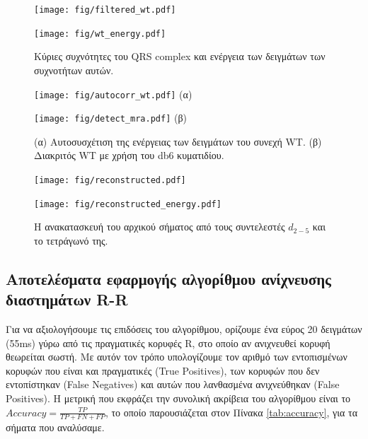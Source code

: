 \documentclass[11pt,a4paper]{article}
\begin{document}
\begin{figure}[H]
\centering
\begin{minipage}{0.48\textwidth}
	\centering
	\texttt{[image: fig/filtered\_wt.pdf]}
\end{minipage}
\begin{minipage}{0.48\textwidth}
	\centering
	\texttt{[image: fig/wt\_energy.pdf]}
\end{minipage}
\vfill
\caption{Κύριες συχνότητες του QRS complex και ενέργεια των δειγμάτων των συχνοτήτων αυτών.}
\label{fig:algorithm1}
\end{figure}
\begin{figure}[H]
\centering
\begin{minipage}{0.48\textwidth}
	\centering
	\texttt{[image: fig/autocorr\_wt.pdf]}	
	(α)
\end{minipage}
\begin{minipage}{0.48\textwidth}
	\centering
	\texttt{[image: fig/detect\_mra.pdf]}
	(β)
\end{minipage}
\vfill
\caption{(α) Αυτοσυσχέτιση της ενέργειας των δειγμάτων του συνεχή WT. (β) Διακριτός WT με χρήση του db6 κυματιδίου.}
\label{fig:algorithm2}
\end{figure}
\begin{figure}[H]
\centering
\begin{minipage}{0.48\textwidth}
	\centering
	\texttt{[image: fig/reconstructed.pdf]}
\end{minipage}
\begin{minipage}{0.48\textwidth}
	\centering
	\texttt{[image: fig/reconstructed\_energy.pdf]}
\end{minipage}
\vfill
\caption{Η ανακατασκευή του αρχικού σήματος από τους συντελεστές $d_{2-5}$ και το τετράγωνό της.}
\label{fig:algorithm3}
\end{figure}

\pagebreak

\subsection*{Αποτελέσματα εφαρμογής αλγορίθμου ανίχνευσης διαστημάτων R-R}

Για να αξιολογήσουμε τις επιδόσεις του αλγορίθμου, ορίζουμε ένα εύρος 20 δειγμάτων (55ms) γύρω από τις πραγματικές κορυφές R, στο οποίο αν ανιχνευθεί κορυφή θεωρείται σωστή. Με αυτόν τον τρόπο υπολογίζουμε τον αριθμό των εντοπισμένων κορυφών που είναι και πραγματικές (True Positives), των κορυφών που δεν εντοπίστηκαν (False Negatives) και αυτών που λανθασμένα ανιχνεύθηκαν (False Positives). Η μετρική που εκφράζει την συνολική ακρίβεια του αλγορίθμου είναι το $Accuracy = \frac{TP}{TP+FN+FP}$, το οποίο παρουσιάζεται στον Πίνακα \ref{tab:accuracy}, για τα σήματα που αναλύσαμε.
\end{document}

